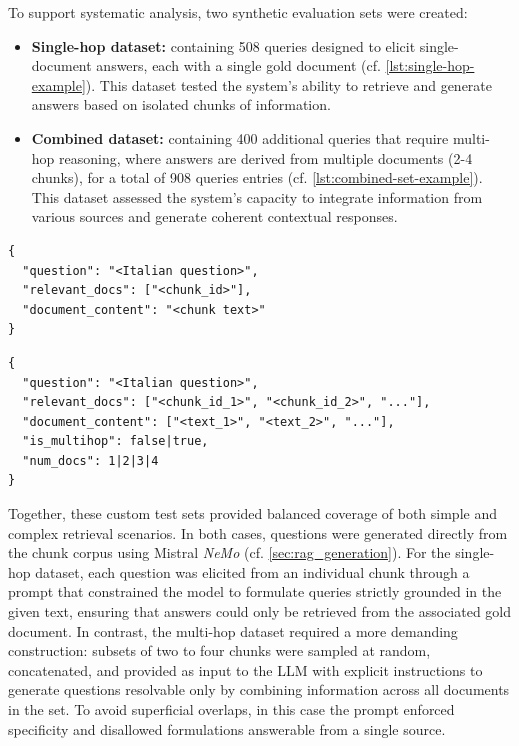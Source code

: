 \begin{spacing}{1.5}
\noindent To support systematic analysis, two synthetic evaluation sets were created:
\begin{itemize}
      \item \textbf{Single-hop dataset:} containing 508 queries designed to elicit single-document answers, each with a single gold document (cf. \autoref{lst:single-hop-example}). This dataset tested the system's ability to retrieve and generate answers based on isolated chunks of information.
      \item \textbf{Combined dataset:} containing 400 additional queries that require multi-hop reasoning, where answers are derived from multiple documents (2-4 chunks), for a total of 908 queries entries (cf. \autoref{lst:combined-set-example}). This dataset assessed the system's capacity to integrate information from various sources and generate coherent contextual responses.
\end{itemize}


\begin{lstlisting}[frame=none,
                   caption={JSON output format for single-hop dataset items.},
                   captionpos=b,
                   label={lst:single-hop-example},
  xleftmargin=0.2\textwidth,
  xrightmargin=0.2\textwidth]
{
  "question": "<Italian question>",
  "relevant_docs": ["<chunk_id>"],
  "document_content": "<chunk text>"
}
\end{lstlisting}

\vspace{0.6em}

\begin{lstlisting}[frame=none,
                   caption={JSON output format for combined dataset items, including single-hop and multi-hop questions.},
                   captionpos=b,
                   label={lst:combined-set-example},
  xleftmargin=0.05\textwidth,
  xrightmargin=0.05\textwidth]
{
  "question": "<Italian question>",
  "relevant_docs": ["<chunk_id_1>", "<chunk_id_2>", "..."],
  "document_content": ["<text_1>", "<text_2>", "..."],
  "is_multihop": false|true,
  "num_docs": 1|2|3|4
}
\end{lstlisting}
\vspace{0.6em}

Together, these custom test sets provided balanced coverage of both simple and complex retrieval scenarios. In both cases, questions were generated directly from the chunk corpus using Mistral \textit{NeMo} (cf. \autoref{sec:rag_generation}). For the single-hop dataset, each question was elicited from an individual chunk through a prompt that constrained the model to formulate queries strictly grounded in the given text, ensuring that answers could only be retrieved from the associated gold document. In contrast, the multi-hop dataset required a more demanding construction: subsets of two to four chunks were sampled at random, concatenated, and provided as input to the LLM with explicit instructions to generate questions resolvable only by combining information across all documents in the set. To avoid superficial overlaps, in this case the prompt enforced specificity and disallowed formulations answerable from a single source.



\end{spacing}
